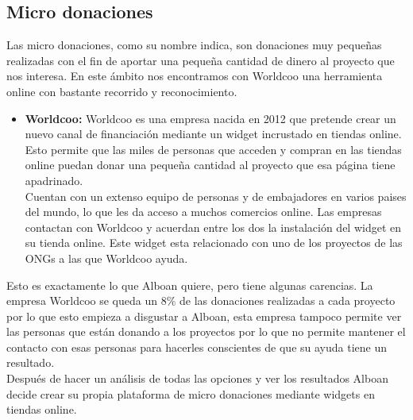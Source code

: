 \subsection{Micro donaciones}

Las micro donaciones, como su nombre indica, son donaciones muy pequeñas realizadas con el fin de aportar una pequeña cantidad de dinero al proyecto que nos interesa. En este ámbito nos encontramos con Worldcoo una herramienta online con bastante recorrido y reconocimiento.

\begin{itemize}
	\item \textbf{Worldcoo:} \smallbreak
	Worldcoo es una empresa nacida en 2012 que pretende crear un nuevo canal de financiación mediante un widget incrustado en tiendas online. Esto permite que las miles de personas que acceden y compran en las tiendas online puedan donar una pequeña cantidad al proyecto que esa página tiene apadrinado.\\
	Cuentan con un extenso equipo de personas y de embajadores en varios paises del mundo, lo que les da acceso a muchos comercios online. Las empresas contactan con Worldcoo y acuerdan entre los dos la instalación del widget en su tienda online. Este widget esta relacionado con uno de los proyectos de las ONGs a las que Worldcoo ayuda.
\end{itemize}

Esto es exactamente lo que Alboan quiere, pero tiene algunas carencias. La empresa Worldcoo se queda un 8\% de las donaciones realizadas a cada proyecto por lo que esto empieza a disgustar a Alboan, esta empresa tampoco permite ver las personas que están donando a los proyectos por lo que no permite mantener el contacto con esas personas para hacerles conscientes de que su ayuda tiene un resultado. \\

Después de hacer un análisis de todas las opciones y ver los resultados Alboan decide crear su propia plataforma de micro donaciones mediante widgets en tiendas online.
